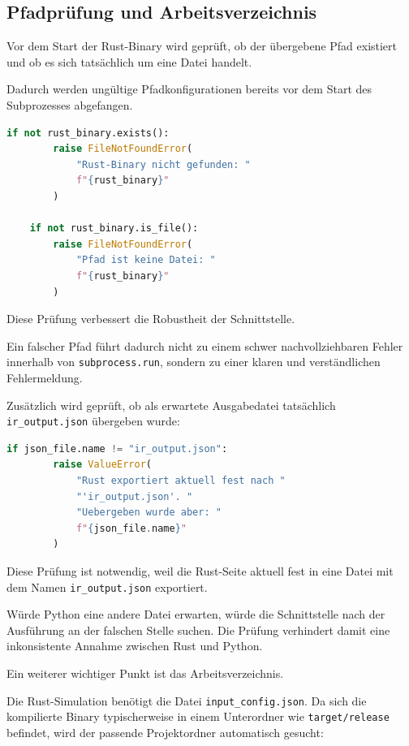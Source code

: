\documentclass{article}
\begin{document}
    \subsection{Pfadprüfung und Arbeitsverzeichnis}
    \label{subsec:path-validation}

    Vor dem Start der Rust-Binary wird geprüft, ob der übergebene Pfad existiert
    und ob es sich tatsächlich um eine Datei handelt.

    Dadurch werden ungültige Pfadkonfigurationen bereits vor dem Start des
    Subprozesses abgefangen.

    \begin{lstlisting}[language=Python]
    if not rust_binary.exists():
        raise FileNotFoundError(
            "Rust-Binary nicht gefunden: "
            f"{rust_binary}"
        )

    if not rust_binary.is_file():
        raise FileNotFoundError(
            "Pfad ist keine Datei: "
            f"{rust_binary}"
        )
    \end{lstlisting}

    Diese Prüfung verbessert die Robustheit der Schnittstelle.

    Ein falscher Pfad führt dadurch nicht zu einem schwer nachvollziehbaren Fehler
    innerhalb von \texttt{subprocess.run}, sondern zu einer klaren und
    verständlichen Fehlermeldung.

    Zusätzlich wird geprüft, ob als erwartete Ausgabedatei tatsächlich
    \texttt{ir\_output.json} übergeben wurde:

    \begin{lstlisting}[language=Python]
    if json_file.name != "ir_output.json":
        raise ValueError(
            "Rust exportiert aktuell fest nach "
            "'ir_output.json'. "
            "Uebergeben wurde aber: "
            f"{json_file.name}"
        )
    \end{lstlisting}

    Diese Prüfung ist notwendig, weil die Rust-Seite aktuell fest in eine Datei
    mit dem Namen \texttt{ir\_output.json} exportiert.

    Würde Python eine andere Datei erwarten, würde die Schnittstelle nach der
    Ausführung an der falschen Stelle suchen. Die Prüfung verhindert damit eine
    inkonsistente Annahme zwischen Rust und Python.

    Ein weiterer wichtiger Punkt ist das Arbeitsverzeichnis.

    Die Rust-Simulation benötigt die Datei \texttt{input\_config.json}. Da sich
    die kompilierte Binary typischerweise in einem Unterordner wie
    \texttt{target/release} befindet, wird der passende Projektordner automatisch
    gesucht:
\end{document}
